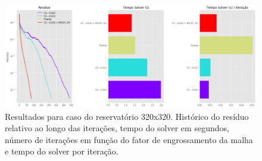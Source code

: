 \begin{figure}[!htbp]
\label{fig:reservatorio320x320_2}
\centering
\includegraphics[width=\textwidth]{chap08/figs/reservatorio320x320_2.png}
\caption{Resultados para caso do reservatório 320x320. Histórico do resíduo relativo ao longo das iterações, tempo do solver em segundos, número de iterações em função do fator de engrossamento da malha e tempo do solver por iteração. }
\end{figure}


